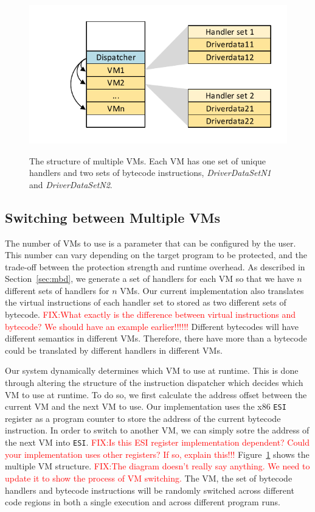 \documentclass[preprint,12pt,3p]{elsarticle}
\newcommand\FIXME[1]{\textcolor{red}{FIX:}\textcolor{red}{#1}}
\begin{document}
\begin{figure}[!t]
  \centering
  \includegraphics[width=0.6\columnwidth]{figure/figmvm.pdf}\\
  \caption{The structure of multiple VMs. Each VM has one set of unique handlers and two sets of bytecode instructions, \emph{DriverDataSetN1} and \emph{DriverDataSetN2}.}\label{fig:Fig.mvm}
\end{figure}


\subsection{Switching between Multiple VMs}
The number of VMs to use is a  parameter that can be configured by the user. This number can vary 
depending on the target program to be protected, and the trade-off between the protection strength and runtime overhead.
As described in Section~\ref{sec:mbd}, we generate a set of handlers for each VM so that
we have $n$ different sets of handlers for $n$ VMs. Our current implementation 
also translates the virtual instructions of each handler set to stored as two different sets of bytecode.
\FIXME{What exactly is the difference between virtual instructions and bytecode? We should have an example 
earlier!!!!!!}
Different bytecodes will have different semantics in different VMs. Therefore, 
there have more than a bytecode could be translated by different handlers in different VMs.

Our system dynamically determines which VM to use at runtime. This is done through altering the structure of the instruction dispatcher 
which decides which VM to use at runtime.
To do so, we first calculate the address offset between the current VM and the next VM to use.
Our implementation uses the x86 \texttt{ESI} register as a program counter to store the 
address of the current bytecode instruction. In order to switch to another VM,
we can simply sotre the address of the next VM into \texttt{ESI}.
\FIXME{Is this ESI register implementation dependent? Could your implementation uses other registers? If so, explain this!!!}
Figure~\ref{fig:Fig.mvm} shows the multiple VM structure. \FIXME{The diagram doesn't really say anything. We need to update it 
to show the process of VM switching.}
The VM, the set of bytecode handlers and bytecode instructions will be randomly switched
across different code regions in both a single execution and across different program runs.
\end{document}
